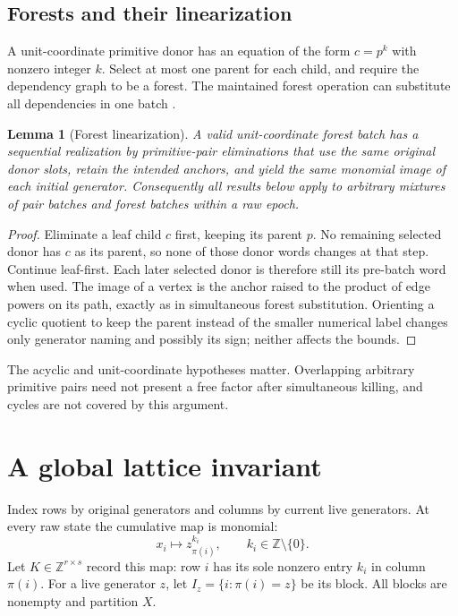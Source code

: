 \documentclass[11pt,letterpaper]{article}
\newtheorem{lemma}[theorem]{Lemma}
\theoremstyle{definition}
\theoremstyle{remark}\newtheorem{remark}[theorem]{Remark}
\newcommand{\Z}{\mathbb Z}\newcommand{\Q}{\mathbb Q}
\begin{document}
\subsection{Forests and their linearization}

A unit-coordinate primitive donor has an equation of the form
$c=p^k$ with nonzero integer $k$. Select at most one parent for each child,
and require the dependency graph to be a forest. The maintained forest
operation can substitute all dependencies in one batch \cite{repo-forest}.

\begin{lemma}[Forest linearization]
\label{lem:forest}
A valid unit-coordinate forest batch has a sequential realization by
primitive-pair eliminations that use the same original donor slots, retain
the intended anchors, and yield the same monomial image of each initial
generator. Consequently all results below apply to arbitrary mixtures of
pair batches and forest batches within a raw epoch.
\end{lemma}
\begin{proof}
Eliminate a leaf child $c$ first, keeping its parent $p$. No remaining
selected donor has $c$ as its parent, so none of those donor words changes
at that step. Continue leaf-first. Each later selected donor is therefore
still its pre-batch word when used. The image of a vertex is the anchor
raised to the product of edge powers on its path, exactly as in simultaneous
forest substitution. Orienting a cyclic quotient to keep the parent instead
of the smaller numerical label changes only generator naming and possibly
its sign; neither affects the bounds.
\end{proof}

The acyclic and unit-coordinate hypotheses matter. Overlapping arbitrary
primitive pairs need not present a free factor after simultaneous killing,
and cycles are not covered by this argument.

\section{A global lattice invariant}
\label{sec:lattice}

Index rows by original generators and columns by current live generators.
At every raw state the cumulative map is monomial:
\begin{equation}
 x_i\longmapsto z_{\pi(i)}^{k_i},\qquad k_i\in\Z\setminus\{0\}.
 \label{eq:monomial}
\end{equation}
Let $K\in\Z^{r\times s}$ record this map: row $i$ has its sole nonzero entry
$k_i$ in column $\pi(i)$. For a live generator $z$, let
$I_z=\{i:\pi(i)=z\}$ be its block. All blocks are nonempty and partition $X$.
\end{document}
